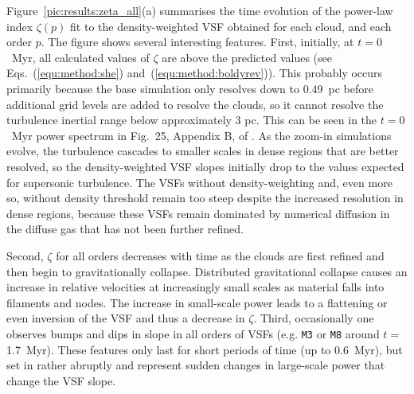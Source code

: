 \documentclass{aa}		%
\begin{document}
Figure~\ref{pic:results:zeta_all}(a) summarises the time evolution of the power-law index $\zeta(p)$ fit to the density-weighted VSF obtained for each cloud, and each order $p$.
The figure shows several interesting features.
First, initially, at $t=0$~Myr, all calculated values of $\zeta$ are above the predicted values (see Eqs.~(\ref{equ:method:she}) and~(\ref{equ:method:boldyrev})).
This  probably occurs primarily because the base simulation only resolves down to 0.49~pc before additional grid levels are added to resolve the clouds, so it cannot resolve the turbulence inertial range below approximately 3 pc.
This can be seen in the $t=0$~Myr power spectrum in Fig.~25, Appendix B, of . 
As the zoom-in simulations evolve, the turbulence cascades to smaller scales in dense regions that are better resolved, so the density-weighted VSF slopes initially drop to the values expected for supersonic turbulence. 
The VSFs without density-weighting and, even more so, without density threshold remain too steep despite the increased resolution in dense regions, because these VSFs remain dominated by numerical diffusion in the diffuse gas that has not been further refined.

Second, $\zeta$ for all orders decreases with time as the clouds are first refined and then begin to gravitationally collapse. Distributed gravitational collapse causes an increase in relative velocities at increasingly small scales as material falls into filaments and nodes.  The increase in small-scale power leads to a flattening or even inversion of the VSF and thus a decrease in $\zeta$.
Third, occasionally one observes bumps and dips in slope in all orders of VSFs (e.g. \texttt{M3} or \texttt{M8} around $t=$1.7~Myr). 
These features only last for short periods of time (up to 0.6~Myr), but set in rather abruptly and represent sudden changes in large-scale power that change the VSF slope. 
\end{document}
